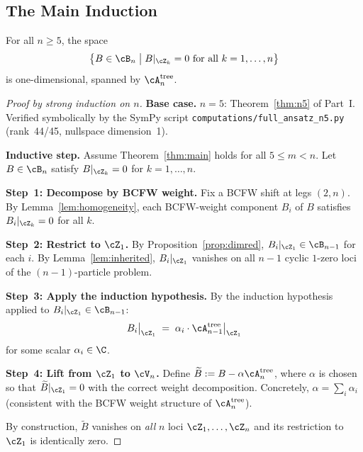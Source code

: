 \subsection{The Main Induction}
\label{ssec:induction}

\begin{theorem}
\label{thm:main}
For all $n \geq 5$, the space
\[
  \bigl\{ B \in \cB_n \;\big|\; B|_{\cZ_k} = 0
  \text{ for all } k = 1, \ldots, n \bigr\}
\]
is one-dimensional, spanned by $\cA_n^{\mathrm{tree}}$.
\end{theorem}

\begin{proof}[Proof by strong induction on $n$]
\textbf{Base case.} $n = 5$: Theorem~\ref{thm:n5} of Part~I.
Verified symbolically by the SymPy script
\texttt{computations/full\_ansatz\_n5.py} (rank~44/45,
nullspace dimension~1).

\medskip
\noindent\textbf{Inductive step.} Assume Theorem~\ref{thm:main}
holds for all $5 \leq m < n$.
Let $B \in \cB_n$ satisfy $B|_{\cZ_k} = 0$ for
$k = 1, \ldots, n$.

\medskip
\noindent\textbf{Step~1: Decompose by BCFW weight.}
Fix a BCFW shift at legs $(2,n)$.
By Lemma~\ref{lem:homogeneity}, each BCFW-weight
component $B_i$ of $B$ satisfies
$B_i|_{\cZ_k} = 0$ for all $k$.

\medskip
\noindent\textbf{Step~2: Restrict to $\cZ_1$.}
By Proposition~\ref{prop:dimred},
$B_i|_{\cZ_1} \in \cB_{n-1}$ for each $i$.
By Lemma~\ref{lem:inherited}, $B_i|_{\cZ_1}$ vanishes
on all $n-1$ cyclic $1$-zero loci of the $(n-1)$-particle
problem.

\medskip
\noindent\textbf{Step~3: Apply the induction hypothesis.}
By the induction hypothesis applied to $B_i|_{\cZ_1}
\in \cB_{n-1}$:
\[
  B_i\big|_{\cZ_1} \;=\; \alpha_i \cdot
  \cA_{n-1}^{\mathrm{tree}}\big|_{\cZ_1}
\]
for some scalar $\alpha_i \in \C$.

\medskip
\noindent\textbf{Step~4: Lift from $\cZ_1$ to $\cV_n$.}
Define $\widetilde{B} := B - \alpha \cA_n^{\mathrm{tree}}$,
where $\alpha$ is chosen so that $\widetilde{B}|_{\cZ_1} = 0$
with the correct weight decomposition. Concretely,
$\alpha = \sum_i \alpha_i$ (consistent with the BCFW
weight structure of $\cA_n^{\mathrm{tree}}$).

By construction, $\widetilde{B}$ vanishes on \emph{all}
$n$ loci $\cZ_1, \ldots, \cZ_n$ and its restriction to
$\cZ_1$ is identically zero.


\end{proof}
